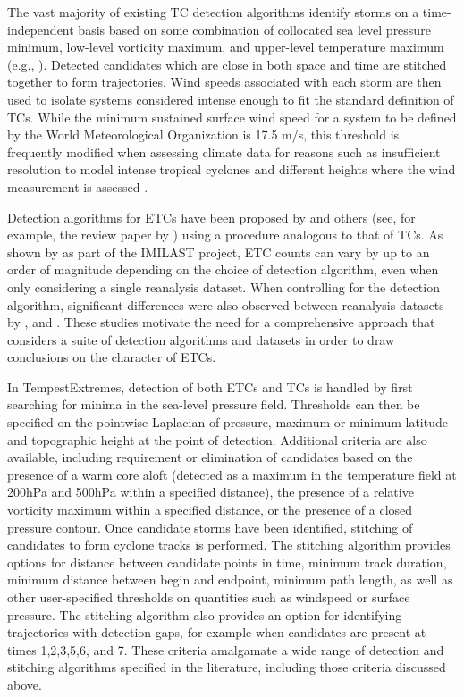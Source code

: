\documentclass[11pt]{article}
\newcommand\citep{\cite}
\newcommand\citet{\cite}
\begin{document}
The vast majority of existing TC detection algorithms identify storms on a time-independent basis based on some combination of collocated sea level pressure minimum, low-level vorticity maximum, and upper-level temperature maximum (e.g., \citet{Vitart1997,Oouchi2006,Bengtsson2007a,Knutson2007,Walsh2007,Tory2013a,Zarzycki2014AMIPTCs}). Detected candidates which are close in both space and time are stitched together to form trajectories. Wind speeds associated with each storm are then used to isolate systems considered intense enough to fit the standard definition of TCs. While the minimum sustained surface wind speed for a system to be defined by the World Meteorological Organization is 17.5 m/s, this threshold is frequently modified when assessing climate data for reasons such as insufficient resolution to model intense tropical cyclones and different heights where the wind measurement is assessed \citep{Walsh2007}.

Detection algorithms for ETCs have been proposed by \cite{wang2006climatology, wernli2006surface, raible2008northern} and others (see, for example, the review paper by \cite{ulbrich2009extra}) using a procedure analogous to that of TCs.  As shown by \cite{neu2013imilast} as part of the IMILAST project, ETC counts can vary by up to an order of magnitude depending on the choice of detection algorithm, even when only considering a single reanalysis dataset.  When controlling for the detection algorithm, significant differences were also observed between reanalysis datasets by \cite{hodges2003comparison}, \cite{wang2006climatology} and \cite{raible2008northern}.  These studies motivate the need for a comprehensive approach that considers a suite of detection algorithms and datasets in order to draw conclusions on the character of ETCs.

In TempestExtremes, detection of both ETCs and TCs is handled by first searching for minima in the sea-level pressure field.  Thresholds can then be specified on the pointwise Laplacian of pressure, maximum or minimum latitude and topographic height at the point of detection.  Additional criteria are also available, including requirement or elimination of candidates based on the presence of a warm core aloft (detected as a maximum in the temperature field at 200hPa and 500hPa within a specified distance), the presence of a relative vorticity maximum within a specified distance, or the presence of a closed pressure contour.  Once candidate storms have been identified, stitching of candidates to form cyclone tracks is performed.  The stitching algorithm provides options for distance between candidate points in time, minimum track duration, minimum distance between begin and endpoint, minimum path length, as well as other user-specified thresholds on quantities such as windspeed or surface pressure.  The stitching algorithm also provides an option for identifying trajectories with detection gaps, for example when candidates are present at times 1,2,3,5,6, and 7.  These criteria amalgamate a wide range of detection and stitching algorithms specified in the literature, including those criteria discussed above.
\end{document}
